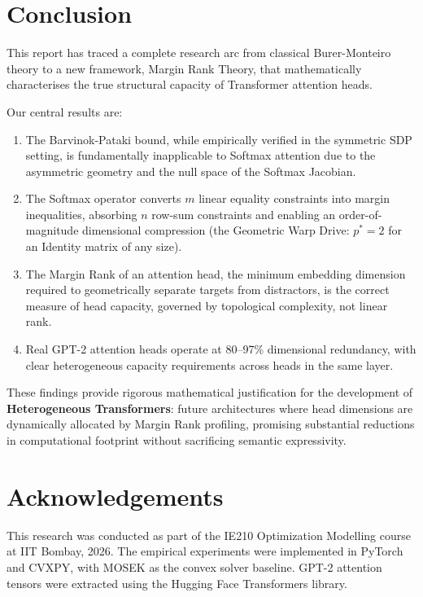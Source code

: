 \section{Conclusion}
\label{sec:conclusion}

This report has traced a complete research arc from classical Burer-Monteiro theory to a new
framework, Margin Rank Theory, that mathematically characterises the true structural
capacity of Transformer attention heads.

Our central results are:
\begin{enumerate}
  \item The Barvinok-Pataki bound, while empirically verified in the symmetric SDP setting,
        is fundamentally inapplicable to Softmax attention due to the asymmetric geometry and
        the null space of the Softmax Jacobian.
  \item The Softmax operator converts $m$ linear equality constraints into margin
        inequalities, absorbing $n$ row-sum constraints and enabling an order-of-magnitude
        dimensional compression (the Geometric Warp Drive: $p^*=2$ for an Identity matrix of
        any size).
  \item The Margin Rank of an attention head, the minimum embedding dimension required to
        geometrically separate targets from distractors, is the correct measure of head
        capacity, governed by topological complexity, not linear rank.
  \item Real GPT-2 attention heads operate at 80--97\% dimensional redundancy, with clear
        heterogeneous capacity requirements across heads in the same layer.
\end{enumerate}

These findings provide rigorous mathematical justification for the development of
\textbf{Heterogeneous Transformers}: future architectures where head dimensions are
dynamically allocated by Margin Rank profiling, promising substantial reductions in
computational footprint without sacrificing semantic expressivity.

\section*{Acknowledgements}

This research was conducted as part of the IE210 Optimization Modelling course at IIT
Bombay, 2026. The empirical experiments were implemented in PyTorch and CVXPY, with MOSEK
as the convex solver baseline. GPT-2 attention tensors were extracted using the Hugging Face
Transformers library.

% 